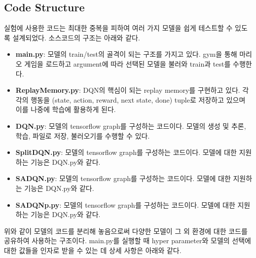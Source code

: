 \subsection{Code Structure}
\label{sec:dev:code}
실험에 사용한 코드는 최대한 중복을 피하여 여러 가지 모델을 쉽게 테스트할 수 있도록 설계되었다.
소스코드의 구조는 아래와 같다.
%
\begin{itemize}
	\item \textbf{main.py}:
		모델의 train/test의 골격이 되는 구조를 가지고 있다. gym을 통해 마리오 게임을 로드하고 argument에 따라 선택된 모델을 불러와 train과 test를 수행한다.
	\item \textbf{ReplayMemory.py}:
		DQN의 핵심이 되는 replay memory를 구현하고 있다.
		각각의 행동을 (state, action, reward, next state, done) tuple로 저장하고 있으며 이를 나중에 학습에 활용하게 된다.
	\item \textbf{DQN.py}:
		\dqn 모델의 tensorflow graph를 구성하는 코드이다.
		모델의 생성 및 추론, 학습, 파일로 저장, 불러오기를 수행할 수 있다.
	\item \textbf{SplitDQN.py}:
		\sdqn 모델의 tensorflow graph를 구성하는 코드이다.
		모델에 대한 지원하는 기능은 DQN.py와 같다.
	\item \textbf{SADQN.py}:
		\sadqn 모델의 tensorflow graph를 구성하는 코드이다.
		모델에 대한 지원하는 기능은 DQN.py와 같다.
	\item \textbf{SADQNp.py}:
		\sapdqn 모델의 tensorflow graph를 구성하는 코드이다.
		모델에 대한 지원하는 기능은 DQN.py와 같다.
\end{itemize}
%
위와 같이 모델의 코드를 분리해 놓음으로써 다양한 모델이 그 외 환경에 대한 코드를 공유하여 사용하는 구조이다.
main.py를 실행할 때 hyper parameter와 모델의 선택에 대한 값들을 인자로 받을 수 있는 데 상세 사항은 아래와 같다.
%
